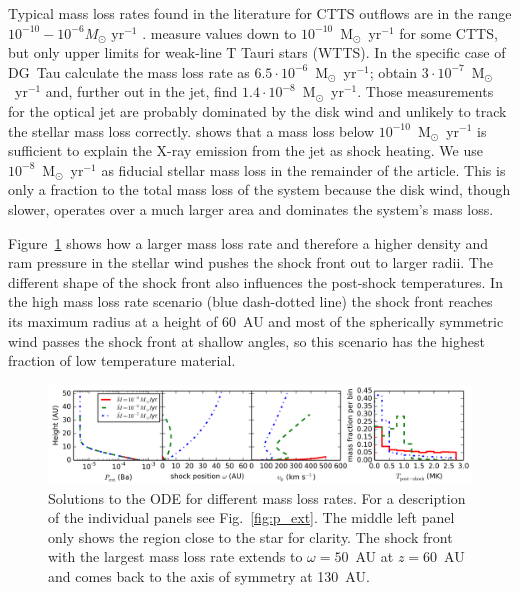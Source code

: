 \documentclass{emulateapj}
\begin{document}
Typical mass loss rates found in the literature for CTTS outflows are in the range $10^{-10}-10^{-6}M_{\odot}\textrm{ yr}^{-1}$ \citep{1999A&A...342..717B,2006A&A...456..189P}. \citet{2006ApJ...646..319E} measure values down to $10^{-10}$~M$_{\odot}$~yr$^{-1}$ for some CTTS, but only upper limits for weak-line T Tauri stars (WTTS). In the specific case of DG~Tau \citet{1997A&A...327..671L} calculate the  mass loss rate as $6.5\cdot 10^{-6}$~M$_{\odot}$~yr$^{-1}$; \citet{1995ApJ...452..736H}
obtain $3\cdot 10^{-7}$~M$_{\odot}$~yr$^{-1}$ and, further out in the jet, \citet{2000A&A...356L..41L} find $1.4\cdot 10^{-8}$~M$_{\odot}$~yr$^{-1}$. Those measurements for the optical jet are probably dominated by the disk wind \citep[e.g.][]{2014arXiv1404.0728W} and unlikely to track the stellar mass loss correctly.
\citet{2009A&A...493..579G} shows that a mass loss below $10^{-10}$~M$_{\odot}$~yr$^{-1}$ is sufficient to explain the X-ray emission from the jet as shock heating.
We use $10^{-8}$~M$_{\odot}$~yr$^{-1}$ as fiducial stellar mass loss in the remainder of the article. This is only a fraction to the total mass loss of the system because the disk wind, though slower, operates over a much larger area and dominates the system's mass loss.

Figure~\ref{fig:dot_m} shows how a larger mass loss rate and therefore a higher density and ram pressure in the stellar wind pushes the shock front out to larger radii. The different shape of the shock front also influences the post-shock temperatures. In the high mass loss rate scenario (blue dash-dotted line) the shock front reaches its maximum radius at a height of 60~AU and most of the spherically symmetric wind passes the shock front at shallow angles, so this scenario has the highest fraction of low temperature material.


\begin{figure}[h!]
\begin{center}
\includegraphics[width=1\columnwidth]{figures/dot_m/dot_m.png}
\caption{\label{fig:dot_m}
Solutions to the ODE for different mass loss rates. For a description of the individual panels see Fig.~\ref{fig:p_ext}. The middle left panel only shows the region close to the star for clarity. The shock front with the largest mass loss rate extends to $\omega=50$~AU at $z=60$~AU and comes back to the axis of symmetry at 130~AU.}
\end{center}
\end{figure}
\end{document}
